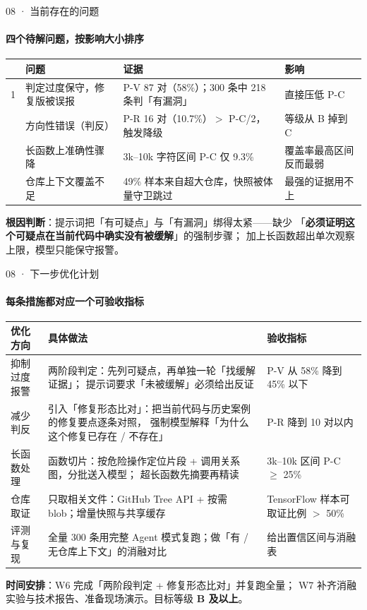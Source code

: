 \documentclass{beamer}
\begin{document}
\begin{frame}{08 · 当前存在的问题}
\framesubtitle{四个待解问题，按影响大小排序}
\scriptsize
\begin{tabular}{@{}p{}p{}p{}p{}@{}}
\toprule
 & \textbf{问题} & \textbf{证据} & \textbf{影响} \\
\midrule
1 & 判定过度保守，修复版被误报 & P-V 87 对（58\%）；300 条中 218 条判「有漏洞」 & 直接压低 P-C \\
\addlinespace[1pt]
2 & 方向性错误（判反） & P-R 16 对（10.7\%）$>$ P-C/2，触发降级 & 等级从 B 掉到 C \\
\addlinespace[1pt]
3 & 长函数上准确性骤降 & 3k--10k 字符区间 P-C 仅 9.3\% & 覆盖率最高区间反而最弱 \\
\addlinespace[1pt]
4 & 仓库上下文覆盖不足 & 49\% 样本来自超大仓库，快照被体量守卫跳过 & 最强的证据用不上 \\
\bottomrule
\end{tabular}

\vspace{0.5em}
{\scriptsize \textbf{根因判断}：提示词把「有可疑点」与「有漏洞」绑得太紧——缺少
「\textbf{必须证明这个可疑点在当前代码中确实没有被缓解}」的强制步骤；
加上长函数超出单次观察上限，模型只能保守报警。}
\end{frame}

\begin{frame}{08 · 下一步优化计划}
\framesubtitle{每条措施都对应一个可验收指标}
\tiny
\begin{tabular}{@{}p{}p{}p{}@{}}
\toprule
\textbf{优化方向} & \textbf{具体做法} & \textbf{验收指标} \\
\midrule
抑制过度报警 & 两阶段判定：先列可疑点，再单独一轮「找缓解证据」；
提示词要求「未被缓解」必须给出反证 & P-V 从 58\% 降到 45\% 以下 \\
\addlinespace[1pt]
减少判反 & 引入「修复形态比对」：把当前代码与历史案例的修复要点逐条对照，
强制模型解释「为什么这个修复已存在 / 不存在」 & P-R 降到 10 对以内 \\
\addlinespace[1pt]
长函数处理 & 函数切片：按危险操作定位片段 + 调用关系图，分批送入模型；
超长函数先摘要再精读 & 3k--10k 区间 P-C $\geq$ 25\% \\
\addlinespace[1pt]
仓库取证 & 只取相关文件：GitHub Tree API + 按需 blob；增量快照与共享缓存
& TensorFlow 样本可取证比例 $>$ 50\% \\
\addlinespace[1pt]
评测与复现 & 全量 300 条用完整 Agent 模式复跑；做「有 / 无仓库上下文」的消融对比
& 给出置信区间与消融表 \\
\bottomrule
\end{tabular}

\vspace{0.5em}
{\scriptsize \textbf{时间安排}：W6 完成「两阶段判定 + 修复形态比对」并复跑全量；
W7 补齐消融实验与技术报告、准备现场演示。目标等级 \textbf{B 及以上}。}
\end{frame}
\end{document}
